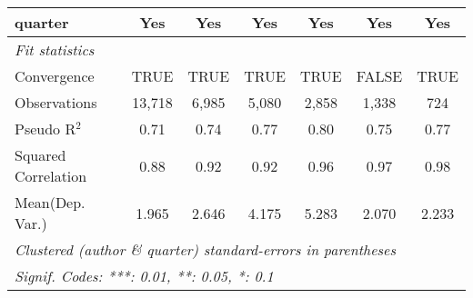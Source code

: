\begin{tabular}{lcccccc}
   quarter                                                    & Yes           & Yes           & Yes          & Yes           & Yes          & Yes\\  
   \midrule
   \emph{Fit statistics}\\
   Convergence                                                &TRUE           & TRUE          & TRUE         & TRUE          & FALSE        & TRUE\\  
   Observations                                               & 13,718        & 6,985         & 5,080        & 2,858         & 1,338        & 724\\  
   Pseudo R$^2$                                               & 0.71          & 0.74          & 0.77         & 0.80          & 0.75         & 0.77\\  
   Squared Correlation                                        & 0.88          & 0.92          & 0.92         & 0.96          & 0.97         & 0.98\\  
Mean(Dep. Var.) & 1.965 & 2.646 & 4.175 & 5.283 & 2.070 & 2.233 \\
   \midrule \midrule
   \multicolumn{7}{l}{\emph{Clustered (author \& quarter) standard-errors in parentheses}}\\
   \multicolumn{7}{l}{\emph{Signif. Codes: ***: 0.01, **: 0.05, *: 0.1}}\\
\end{tabular}
\par\endgroup
